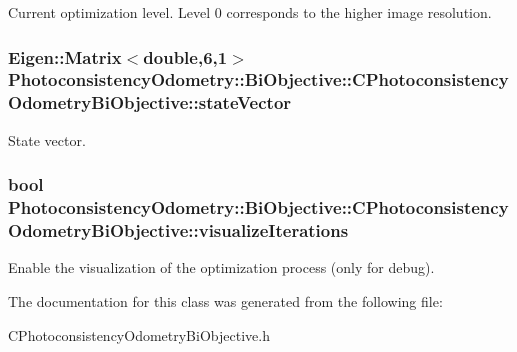 Current optimization level. Level 0 corresponds to the higher image resolution. \hypertarget{class_photoconsistency_odometry_1_1_bi_objective_1_1_c_photoconsistency_odometry_bi_objective_a1ca67345fb32011d2af5db3d9d512ca1}{
\subsubsection[{stateVector}]{\setlength{\rightskip}{0pt plus 5cm}Eigen::Matrix$<$double,6,1$>$ {\bf PhotoconsistencyOdometry::BiObjective::CPhotoconsistencyOdometryBiObjective::stateVector}}}
\label{class_photoconsistency_odometry_1_1_bi_objective_1_1_c_photoconsistency_odometry_bi_objective_a1ca67345fb32011d2af5db3d9d512ca1}
State vector. \hypertarget{class_photoconsistency_odometry_1_1_bi_objective_1_1_c_photoconsistency_odometry_bi_objective_aa6a0112aba3c34e3c523612694e2ec69}{
\subsubsection[{visualizeIterations}]{\setlength{\rightskip}{0pt plus 5cm}bool {\bf PhotoconsistencyOdometry::BiObjective::CPhotoconsistencyOdometryBiObjective::visualizeIterations}}}
\label{class_photoconsistency_odometry_1_1_bi_objective_1_1_c_photoconsistency_odometry_bi_objective_aa6a0112aba3c34e3c523612694e2ec69}
Enable the visualization of the optimization process (only for debug). 

The documentation for this class was generated from the following file:\begin{DoxyCompactItemize}
\item 
CPhotoconsistencyOdometryBiObjective.h\end{DoxyCompactItemize}
